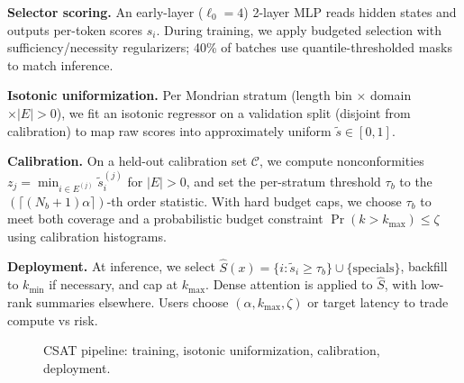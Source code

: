 \documentclass[11pt]{article}
\begin{document}
\textbf{Selector scoring.} An early-layer ($\ell_0=4$) 2-layer MLP reads hidden states and outputs per-token scores $s_i$. During training, we apply budgeted selection with sufficiency/necessity regularizers; 40\% of batches use quantile-thresholded masks to match inference.

\textbf{Isotonic uniformization.} Per Mondrian stratum (length bin $\times$ domain $\times |E|>0$), we fit an isotonic regressor on a validation split (disjoint from calibration) to map raw scores into approximately uniform $\tilde{s}\in[0,1]$.

\textbf{Calibration.} On a held-out calibration set $\mathcal{C}$, we compute nonconformities $z_j=\min_{i\in E^{(j)}} \tilde{s}^{(j)}_i$ for $|E|>0$, and set the per-stratum threshold $\tau_b$ to the $(\lceil (N_b+1)\alpha\rceil)$-th order statistic. With hard budget caps, we choose $\tau_b$ to meet both coverage and a probabilistic budget constraint $\Pr(k>k_{\max})\leq \zeta$ using calibration histograms.

\textbf{Deployment.} At inference, we select $\hat{S}(x)=\{i:\tilde{s}_i\geq\tau_b\}\cup\{\text{specials}\}$, backfill to $k_{\min}$ if necessary, and cap at $k_{\max}$. Dense attention is applied to $\hat{S}$, with low-rank summaries elsewhere. Users choose $(\alpha,k_{\max},\zeta)$ or target latency to trade compute vs risk.

\begin{figure}[t]
\centering
{}
\caption{CSAT pipeline: training, isotonic uniformization, calibration, deployment.}
\end{figure}
\end{document}
